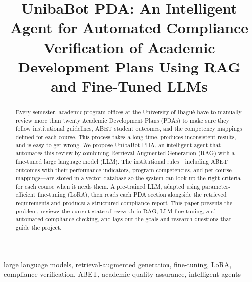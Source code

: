 \documentclass[conference]{IEEEtran}
\begin{document}
\title{UnibaBot PDA: An Intelligent Agent for Automated Compliance Verification of Academic Development Plans Using RAG and Fine-Tuned LLMs}

\author{
\and
{}
}

\maketitle

\begin{abstract}
Every semester, academic program offices at the University of Ibagu\'{e} have to manually review more than twenty Academic Development Plans (PDAs) to make sure they follow institutional guidelines, ABET student outcomes, and the competency mappings defined for each course. This process takes a long time, produces inconsistent results, and is easy to get wrong. We propose UnibaBot PDA, an intelligent agent that automates this review by combining Retrieval-Augmented Generation (RAG) with a fine-tuned large language model (LLM). The institutional rules---including ABET outcomes with their performance indicators, program competencies, and per-course mappings---are stored in a vector database so the system can look up the right criteria for each course when it needs them. A pre-trained LLM, adapted using parameter-efficient fine-tuning (LoRA), then reads each PDA section alongside the retrieved requirements and produces a structured compliance report. This paper presents the problem, reviews the current state of research in RAG, LLM fine-tuning, and automated compliance checking, and lays out the goals and research questions that guide the project.
\end{abstract}

\begin{IEEEkeywords}
large language models, retrieval-augmented generation, fine-tuning, LoRA, compliance verification, ABET, academic quality assurance, intelligent agents
\end{IEEEkeywords}
\end{document}

